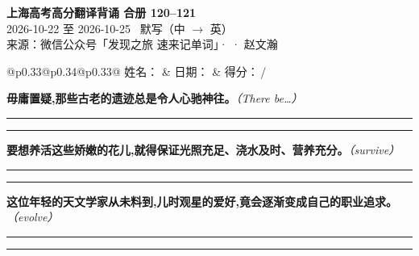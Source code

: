 \documentclass[11pt,a4paper]{article}
\newcommand{\num}[1]{\makebox[1.9em][r]{#1.}\hspace{0.3em}}
\newcommand{\wline}{\noindent\rule{\linewidth}{0.4pt}}
\newcommand{\prompt}[1]{\emph{\textcolor{tipblue}{\small（#1）}}}
\begin{document}
\pagestyle{plain}
\begin{center}
{\LARGE\bfseries 上海高考高分翻译背诵 \quad 合册 120–121}\\[0.25em]
{\large 2026-10-22 至 2026-10-25 \quad\ 默写（中 $\to$ 英）}\\[0.35em]
{\footnotesize 来源：微信公众号「发现之旅 速来记单词」·  · 赵文瀚}
\end{center}

\vspace{0.4em}
\noindent\begin{tabular}{@{}p{0.33\textwidth}@{}p{0.34\textwidth}@{}p{0.33\textwidth}@{}}
姓名：\underline{\hspace{2.0cm}} & 日期：\underline{\hspace{2.0cm}} & 得分：\underline{\hspace{1.4cm}}\,/ \\
\end{tabular}

\vspace{0.5em}

\vspace{0.8em}
\vspace{0.35em}\vspace{0.15em}

\begin{minipage}{\linewidth}

\num{1}\textbf{毋庸置疑,那些古老的遗迹总是令人心驰神往。}\prompt{There be…}

\vspace{0.3em}

\wline\vspace{0.3em}
\wline

\end{minipage}

\begin{minipage}{\linewidth}

\num{2}\textbf{要想养活这些娇嫩的花儿,就得保证光照充足、浇水及时、营养充分。}\prompt{survive}

\vspace{0.3em}

\wline\vspace{0.3em}
\wline

\end{minipage}

\begin{minipage}{\linewidth}

\num{3}\textbf{这位年轻的天文学家从未料到,儿时观星的爱好,竟会逐渐变成自己的职业追求。}\prompt{evolve}

\vspace{0.3em}

\wline\vspace{0.3em}
\wline

\end{minipage}
\end{document}
